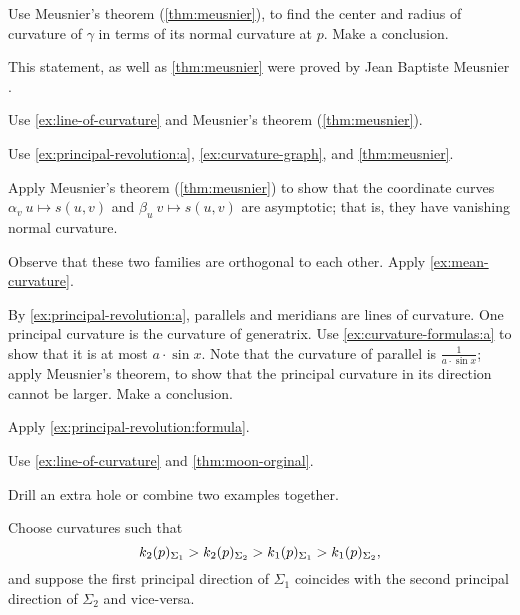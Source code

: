 \begin{multicols}{2}
Use Meusnier's theorem (\ref{thm:meusnier}), to find the center and radius of curvature of $\gamma$ in terms of its normal curvature at $p$.
Make a conclusion.

This statement, as well as \ref{thm:meusnier} were proved by Jean Baptiste Meusnier \cite{meusnier}.

Use \ref{ex:line-of-curvature} and Meusnier's theorem (\ref{thm:meusnier}).

Use \ref{ex:principal-revolution:a},  \ref{ex:curvature-graph}, and \ref{thm:meusnier}.

 Apply Meusnier's theorem (\ref{thm:meusnier}) to show that the coordinate curves $\alpha_v\:u\mapsto s(u,v)$ and $\beta_u\:v\mapsto s(u,v)$ are asymptotic; that is, they have vanishing normal curvature.

Observe that these two families are orthogonal to each other.
Apply \ref{ex:mean-curvature}.

By \ref{ex:principal-revolution:a}, parallels and meridians are lines of curvature.
One principal curvature is the curvature of generatrix.
Use \ref{ex:curvature-formulas:a} to show that it is at most $a\cdot \sin x$.
Note that the curvature of parallel is $\tfrac1{a\cdot \sin x}$;
apply Meusnier's theorem, to show that the principal curvature in its direction cannot be larger.
Make a conclusion.

 Apply \ref{ex:principal-revolution:formula}.

Use \ref{ex:line-of-curvature} and \ref{thm:moon-orginal}.

 Drill an extra hole or combine two examples together.



\setcounter{eqtn}{0}

Choose curvatures such that 
\[k_2(p)_{\Sigma_1}\z>k_2(p)_{\Sigma_2}> k_1(p)_{\Sigma_1}> k_1(p)_{\Sigma_2},\]
and suppose the first principal direction of $\Sigma_1$ coincides with the second principal direction of $\Sigma_2$ and vice-versa.


\end{multicols}
